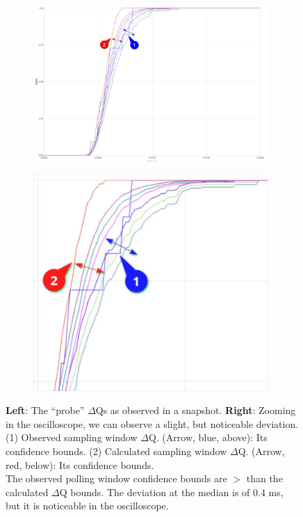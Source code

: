        \begin{figure}[H]
            \centering
            \begin{subfigure}{.5\textwidth}
                \centering
                \includegraphics[width=0.98\textwidth]{img/overload_2/150_probe2.pdf}
                \label{fig:ovuvv}
            \end{subfigure}%
            \begin{subfigure}{.5\textwidth}
                \centering
                \includegraphics[width =0.98\textwidth]{img/overload_2/150_probe2zoom_cropped.pdf}
                \label{fig:ovovv}
            \end{subfigure}
            \caption{\textbf{Left}: The ``probe'' $\Delta$Qs as observed in a snapshot. \textbf{Right}: Zooming in the oscilloscope, we can observe a slight, but noticeable deviation. (1) Observed sampling window $\Delta$Q. (Arrow, blue, above): Its confidence bounds. (2) Calculated sampling window $\Delta$Q. (Arrow, red, below): Its confidence bounds. \\ The observed polling window confidence bounds are $>$ than the calculated $\Delta$Q bounds. The deviation at the median is of 0.4 ms, but it is noticeable in the oscilloscope.}
            \label{fig:avavv} 
        \end{figure}
       
